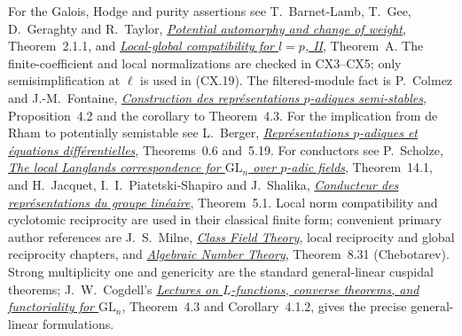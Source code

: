 For the Galois, Hodge and purity assertions see
T.~Barnet-Lamb, T.~Gee, D.~Geraghty and R.~Taylor,
\href{https://www.ma.imperial.ac.uk/~tsg/Index_files/potentialautomorphy.pdf}
{\emph{Potential automorphy and change of weight}},
Theorem~2.1.1, and
\href{https://arxiv.org/pdf/1105.2242}
{\emph{Local-global compatibility for $l=p$, II}},
Theorem~A.  The finite-coefficient and local
normalizations are checked in CX3--CX5; only
semisimplification at $\ell$ is used in (CX.19).
The filtered-module fact is P.~Colmez and J.-M.~Fontaine,
\href{https://webusers.imj-prg.fr/~pierre.colmez/CF.pdf}
{\emph{Construction des repr\'esentations $p$-adiques
semi-stables}}, Proposition~4.2 and the corollary to
Theorem~4.3.
For the implication from de Rham to potentially semistable see
L.~Berger,
\href{https://arxiv.org/pdf/math/0102179}
{\emph{Repr\'esentations $p$-adiques et \'equations
diff\'erentielles}}, Theorems~0.6 and~5.19.
For conductors see P.~Scholze,
\href{https://people.mpim-bonn.mpg.de/scholze/LocalLanglands.pdf}
{\emph{The local Langlands correspondence for
$\mathrm{GL}_n$ over $p$-adic fields}}, Theorem~14.1,
and H.~Jacquet, I.~I.~Piatetski-Shapiro and J.~Shalika,
\href{https://lesesvre.perso.math.cnrs.fr/newforms-references/jpss.pdf}
{\emph{Conducteur des repr\'esentations du groupe
lin\'eaire}}, Theorem~5.1.
Local norm compatibility and cyclotomic reciprocity are
used in their classical finite form; convenient primary
author references are J.~S.~Milne,
\href{https://www.jmilne.org/math/CourseNotes/CFT.pdf}
{\emph{Class Field Theory}}, local reciprocity and
global reciprocity chapters, and
\href{https://www.jmilne.org/math/CourseNotes/ANT.pdf}
{\emph{Algebraic Number Theory}}, Theorem~8.31
(Chebotarev).  Strong multiplicity one and genericity
are the standard general-linear cuspidal theorems;
J.~W.~Cogdell's
\href{https://people.math.osu.edu/cogdell.1/fields-www.pdf}
{\emph{Lectures on $L$-functions, converse theorems,
and functoriality for $\mathrm{GL}_n$}}, Theorem~4.3
and Corollary~4.1.2, gives the precise general-linear formulations.

